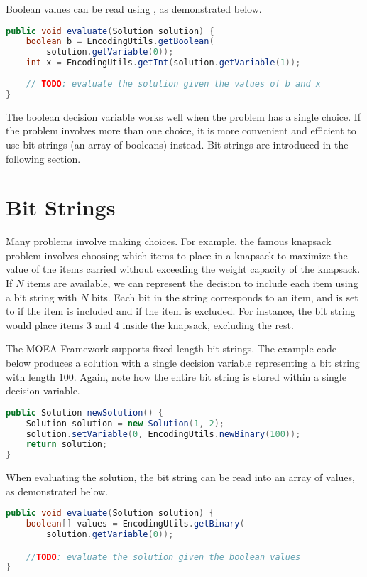 Boolean values can be read using , as demonstrated below.
\begin{lstlisting}[language=Java]
public void evaluate(Solution solution) {
    boolean b = EncodingUtils.getBoolean(
        solution.getVariable(0));
    int x = EncodingUtils.getInt(solution.getVariable(1));
    
    // TODO: evaluate the solution given the values of b and x
}
\end{lstlisting}

The boolean decision variable works well when the problem has a single choice.  If the problem involves more than one choice, it is more convenient and efficient to use bit strings (an array of booleans) instead.  Bit strings are introduced in the following section.

\section{Bit Strings}
Many problems involve making choices.  For example, the famous knapsack problem involves choosing which items to place in a knapsack to maximize the value of the items carried without exceeding the weight capacity of the knapsack.  If $N$ items are available, we can represent the decision to include each item using a bit string with $N$ bits.  Each bit in the string corresponds to an item, and is set to  if the item is included and  if the item is excluded.  For instance, the bit string  would place items 3 and 4 inside the knapsack, excluding the rest.

The MOEA Framework supports fixed-length bit strings.  The example code below produces a solution with a single decision variable representing a bit string with length $100$.  Again, note how the entire bit string is stored within a single decision variable.
\begin{lstlisting}[language=Java]
public Solution newSolution() {
    Solution solution = new Solution(1, 2);
    solution.setVariable(0, EncodingUtils.newBinary(100));
    return solution;
}
\end{lstlisting}

When evaluating the solution, the bit string can be read into an array of  values, as demonstrated below.
\begin{lstlisting}[language=Java]
public void evaluate(Solution solution) {
    boolean[] values = EncodingUtils.getBinary(
        solution.getVariable(0));

    //TODO: evaluate the solution given the boolean values
}
\end{lstlisting}

